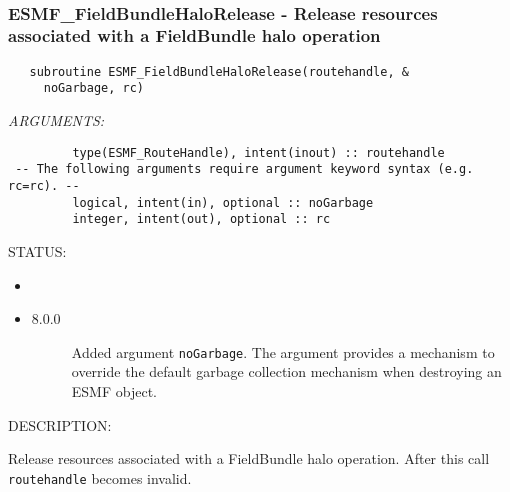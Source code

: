  
\mbox{}\hrulefill\ 
 
\subsubsection [ESMF\_FieldBundleHaloRelease] {ESMF\_FieldBundleHaloRelease - Release resources associated with a FieldBundle halo operation}


  
\begin{verbatim}   subroutine ESMF_FieldBundleHaloRelease(routehandle, &
     noGarbage, rc)\end{verbatim}{\em ARGUMENTS:}
\begin{verbatim}         type(ESMF_RouteHandle), intent(inout) :: routehandle
 -- The following arguments require argument keyword syntax (e.g. rc=rc). --
         logical, intent(in), optional :: noGarbage
         integer, intent(out), optional :: rc\end{verbatim}
{\sf STATUS:}
   \begin{itemize}
   \item{}
   \item{}
   \begin{description}
   \item[8.0.0] Added argument {\tt noGarbage}.
   The argument provides a mechanism to override the default garbage collection
   mechanism when destroying an ESMF object.
   \end{description}
   \end{itemize}
  
{\sf DESCRIPTION:\\ }


   Release resources associated with a FieldBundle halo operation. After this call
   {\tt routehandle} becomes invalid.
  
